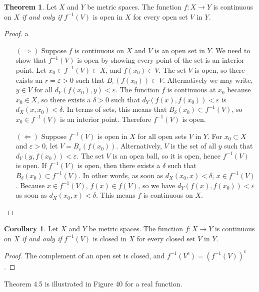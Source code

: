 \documentclass{article}
\theoremstyle{definition}
\newtheorem{theorem}{Theorem}[section]
\newtheorem{corollary}{Corollary}[section]
\begin{document}
	\begin{theorem}
		Let $ X $ and $ Y $ be metric spaces. The function $ f:X\to Y $ is continuous on $ X $ \textit{if and only if} $ f^{-1}(V) $ is open in $ X $ for every open set $ V $ in $ Y $.
	\end{theorem}
	\begin{proof}
		{\color{white}a}
		\begin{enumerate}
			\item [$ (\Longrightarrow) $] Suppose $ f $ is continuous on $ X $ and $ V$ is an open set in $ Y $. We need to show that $ f^{-1}(V) $ is open by showing every point of the set is an interior point. Let $ x_0\in f^{-1}(V)\subset X $, and $ f(x_0)\in V $. The set $ V $ is open, so there exists an $ r=\varepsilon>0 $ such that $ B_\varepsilon(f(x_0))\subset V $. Alternatively we may write, $ y\in V $ for all $ d_Y(f(x_0),y)<\varepsilon $. The function $ f $ is continuous at $ x_0 $ because $ x_0\in X $, so there exists a $ \delta>0 $ such that $ d_Y(f(x),f(x_0))<\varepsilon $ is $ d_X(x,x_0)<\delta $. In terms of sets, this means that $ B_\delta(x_0)\subset f^{-1}(V) $, so $ x_0\in f^{-1}(V) $ is an interior point. Therefore $ f^{-1}(V) $ is open.
			\item [$ (\Longleftarrow) $] Suppose $ f^{-1}(V) $ is open in $ X $ for all open sets $ V $ in $ Y $. For $ x_0\subset X $ and $ \varepsilon>0 $, let $ V=B_\varepsilon(f(x_0)) $. Alternatively, $ V $ is the set of all $ y $ such that $ d_Y(y,f(x_0))<\varepsilon $. The set $ V $ is an open ball, so it is open, hence $ f^{-1}(V) $ is open. If $ f^{-1}(V) $ is open, then there exists a $ \delta $ such that $ B_\delta(x_0)\subset f^{-1}(V) $. In other words, as soon as $ d_X(x_0,x)<\delta $, $ x\in f^{-1}(V) $. Because $ x\in f^{-1}(V) $, $ f(x)\in f(V) $, so we have $ d_Y(f(x),f(x_0))<\varepsilon $ as soon as $ d_X(x_0,x)<\delta $. This means $ f $ is continuous on $ X $. 
		\end{enumerate}
	\end{proof}
	\begin{corollary}
		Let $ X $ and $ Y $ be metric spaces. The function $ f:X\to Y $ is continuous on $ X $ \textit{if and only if} $ f^{-1}(V) $ is closed in $ X $ for every closed set $ V $ in $ Y $.
	\end{corollary}
	\begin{proof}
		The complement of an open set is closed, and $ f^{-1}(V^c)=(f^{-1}(V))^c $. 
	\end{proof}
	Theorem 4.5 is illustrated in Figure 40 for a real function. 
\end{document}
